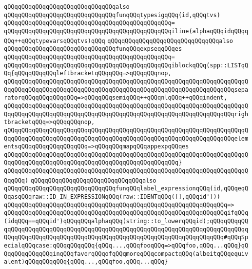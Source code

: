 \verb|qQQqqQQqqQQqqQQqqQQqqQQqqQQqqQQqalso|\newline
\verb|qQQqqQQqqQQqqQQqqQQqqQQqqQQqqQQqfunqQQqtypesigqQQq(id,qQQqtvs)|\newline
\verb|qQQqqQQqqQQqqQQqqQQqqQQqqQQqqQQqqQQqqQQqqQQqqQQq=|\newline
\verb|qQQqqQQqqQQqqQQqqQQqqQQqqQQqqQQqqQQqqQQqqQQqqQQqiline(alphaqQQqidqQQqqQQq++qQQqtypevarsqQQqtvs)qQQq|\newline
\newline
\verb|qQQqqQQqqQQqqQQqqQQqqQQqqQQqqQQqalso|\newline
\verb|qQQqqQQqqQQqqQQqqQQqqQQqqQQqqQQqfunqQQqexpseqqQQqes|\newline
\verb|qQQqqQQqqQQqqQQqqQQqqQQqqQQqqQQqqQQqqQQqqQQqqQQq=|\newline
\verb|qQQqqQQqqQQqqQQqqQQqqQQqqQQqqQQqqQQqqQQqqQQqqQQqiblockqQQq(spp::LISTqQQq{qQQqqQQqqQQqleftbracketqQQqqQQq=>qQQqqQQqnop,|\newline
\verb|qQQqqQQqqQQqqQQqqQQqqQQqqQQqqQQqqQQqqQQqqQQqqQQqqQQqqQQqqQQqqQQqqQQqqQQqqQQqqQQqqQQqqQQqqQQqqQQqqQQqqQQqqQQqqQQqqQQqqQQqqQQqqQQqqQQqqQQqseparatorqQQqqQQqqQQqqQQq=>qQQqqQQqsemiqQQq++qQQqnlqQQq++qQQqindent,|\newline
\verb|qQQqqQQqqQQqqQQqqQQqqQQqqQQqqQQqqQQqqQQqqQQqqQQqqQQqqQQqqQQqqQQqqQQqqQQqqQQqqQQqqQQqqQQqqQQqqQQqqQQqqQQqqQQqqQQqqQQqqQQqqQQqqQQqqQQqqQQqrightbracketqQQq=>qQQqqQQqnop,|\newline
\verb|qQQqqQQqqQQqqQQqqQQqqQQqqQQqqQQqqQQqqQQqqQQqqQQqqQQqqQQqqQQqqQQqqQQqqQQqqQQqqQQqqQQqqQQqqQQqqQQqqQQqqQQqqQQqqQQqqQQqqQQqqQQqqQQqqQQqqQQqelementsqQQqqQQqqQQqqQQqqQQq=>qQQqqQQqmapqQQqappexpqQQqes|\newline
\verb|qQQqqQQqqQQqqQQqqQQqqQQqqQQqqQQqqQQqqQQqqQQqqQQqqQQqqQQqqQQqqQQqqQQqqQQqqQQqqQQqqQQqqQQqqQQqqQQqqQQqqQQqqQQqqQQqqQQqqQQq}|\newline
\verb|qQQqqQQqqQQqqQQqqQQqqQQqqQQqqQQqqQQqqQQqqQQqqQQqqQQqqQQqqQQqqQQqqQQqqQQqqQQq)|\newline
\newline
\verb|qQQqqQQqqQQqqQQqqQQqqQQqqQQqqQQqalso|\newline
\verb|qQQqqQQqqQQqqQQqqQQqqQQqqQQqqQQqfunqQQqlabel_expressionqQQq(id,qQQqeqQQqasqQQqraw::ID_IN_EXPRESSIONqQQq(raw::IDENTqQQq([],qQQqid')))|\newline
\verb|qQQqqQQqqQQqqQQqqQQqqQQqqQQqqQQqqQQqqQQqqQQqqQQqqQQqqQQqqQQqqQQq=>|\newline
\verb|qQQqqQQqqQQqqQQqqQQqqQQqqQQqqQQqqQQqqQQqqQQqqQQqqQQqqQQqqQQqqQQqifqQQq(idqQQq==qQQqid')qQQqqQQqalphaqQQq(string::to_lowerqQQqid);qQQqqQQqqQQqqQQqqQQqqQQqqQQqqQQqqQQqqQQqqQQqqQQqqQQqqQQqqQQqqQQqqQQqqQQqqQQqqQQqqQQqqQQqqQQqqQQqqQQqqQQqqQQqqQQqqQQqqQQqqQQqqQQqqQQqqQQqqQQqqQQq#qQQqSpecialqQQqcase:qQQqqQQqqQQq{qQQq...,qQQqfooqQQq=>qQQqfoo,qQQq...qQQq}qQQqqQQqqQQqqQQqinqQQqfavorqQQqofqQQqmoreqQQqcompactqQQq(albeitqQQqequivalent)qQQqqQQqqQQq{qQQq...,qQQqfoo,qQQq...qQQq}|\newline
